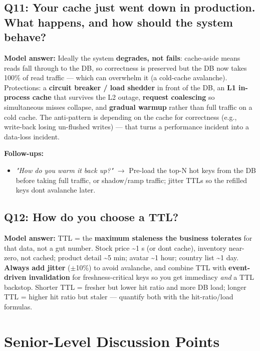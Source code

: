 \documentclass[11pt]{article}
\providecommand{\tightlist}{\setlength{\itemsep}{1pt}\setlength{\parskip}{0pt}}
\begin{document}
\subsection{Q11: Your cache just went down in production. What happens, and how should the system behave?}\label{q11-your-cache-just-went-down-in-production-what-happens-and-how-should-the-system-behave}

\textbf{Model answer:} Ideally the system \textbf{degrades, not fails}: cache-aside means reads fall through to the DB, so correctness is preserved but the DB now takes 100\% of read traffic --- which can overwhelm it (a cold-cache avalanche). Protections: a \textbf{circuit breaker / load shedder} in front of the DB, an \textbf{L1 in-process cache} that survives the L2 outage, \textbf{request coalescing} so simultaneous misses collapse, and \textbf{gradual warmup} rather than full traffic on a cold cache. The anti-pattern is depending on the cache for correctness (e.g., write-back losing un-flushed writes) --- that turns a performance incident into a data-loss incident.

\textbf{Follow-ups:}

\begin{itemize}
\tightlist
\item
  \emph{"How do you warm it back up?"} \(\rightarrow\) Pre-load the top-N hot keys from the DB before taking full traffic, or shadow/ramp traffic; jitter TTLs so the refilled keys don\textquotesingle t avalanche later.
\end{itemize}

\subsection{Q12: How do you choose a TTL?}\label{q12-how-do-you-choose-a-ttl}

\textbf{Model answer:} TTL = the \textbf{maximum staleness the business tolerates} for that data, not a gut number. Stock price \textasciitilde1 s (or don\textquotesingle t cache), inventory near-zero, not cached; product detail \textasciitilde5 min; avatar \textasciitilde1 hour; country list \textasciitilde1 day. \textbf{Always add jitter} (\(\pm\)10\%) to avoid avalanche, and combine TTL with \textbf{event-driven invalidation} for freshness-critical keys so you get immediacy \emph{and} a TTL backstop. Shorter TTL = fresher but lower hit ratio and more DB load; longer TTL = higher hit ratio but staler --- quantify both with the hit-ratio/load formulas.

\section{Senior-Level Discussion Points}\label{senior-level-discussion-points}
\end{document}
